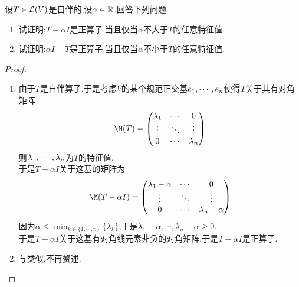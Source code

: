 \documentclass{ctexart}
\begin{document}
\begin{problem}[13.]
    设$T\in\mathcal{L}(V)$是自伴的,设$\alpha\in\mathbb{R}$.回答下列问题.
    \begin{enumerate}[label=\tbf{(\arabic*)}]
        \item 试证明:$T-\alpha I$是正算子,当且仅当$\alpha$不大于$T$的任意特征值.
        \item 试证明:$\alpha I-T$是正算子,当且仅当$\alpha$不小于$T$的任意特征值.
    \end{enumerate}
\end{problem}
\begin{proof}
    \begin{enumerate}[label=\tbf{(\arabic*)}]
        \item 由于$T$是自伴算子,于是考虑$V$的某个规范正交基${e}_1,\cdots,{e}_{n}$使得$T$关于其有对角矩阵
            \[\M(T)=\begin{pmatrix}
                \lambda_1&\cdots&0\\
                \vdots&\ddots&\vdots\\
                0&\cdots&\lambda_n
            \end{pmatrix}\]
            则${\lambda}_1,\cdots,{\lambda}_{n}$为$T$的特征值.\\
            于是$T-\alpha I$关于这基的矩阵为
            \[\M(T-\alpha I)=\begin{pmatrix}
                \lambda_1-\alpha&\cdots&0\\
                \vdots&\ddots&\vdots\\
                0&\cdots&\lambda_n-\alpha
            \end{pmatrix}\]
            因为$\alpha\leqslant\displaystyle\min_{k\in\{1,\cdots,n\}}\{\lambda_k\}$,于是$\lambda_1-\alpha,\cdots,\lambda_n-\alpha\geqslant0$.\\
            于是$T-\alpha I$关于这基有对角线元素非负的对角矩阵,于是$T-\alpha I$是正算子.
        \item 与类似,不再赘述.
    \end{enumerate}
\end{proof}
\end{document}
